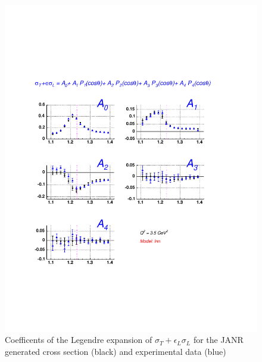 \begin{figure}[h]
 \begin{center}
 \includegraphics[width = 12cm, bb=30 130 540 700]{analysis/img/A_comp_inna} 
  \caption[Coefficents of the Legendre expansion of $\sigma_T+\epsilon_L\sigma_L$ for the JANR generated cross 
  section  and experimental data ]
{ Coefficents of the Legendre expansion of $\sigma_T+\epsilon_L\sigma_L$ for the JANR generated cross 
  section (black) and experimental data (blue) }
 \label{fig:A_comp_inna}
\end{center}
\end{figure}

